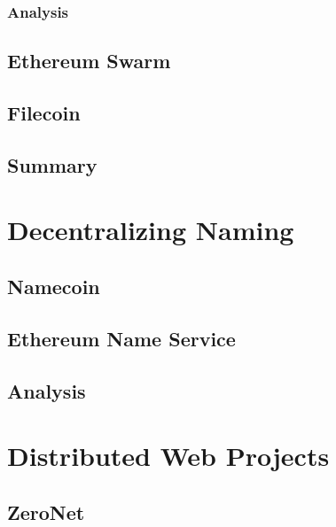 \documentclass[mscthesis]{usiinfthesis}
\begin{document}
\subsection{Analysis}


\section{Ethereum Swarm}\label{proj:swarm}

\section{Filecoin}\label{proj:filecoin}

\section{Summary}


\chapter{Decentralizing Naming}\label{ch:naming}

\section{Namecoin}\label{proj:namecoin}

\section{Ethereum Name Service}\label{proj:ens}

\section{Analysis}


\chapter{Distributed Web Projects}

\section{ZeroNet}\label{proj:zeronet}
\end{document}
